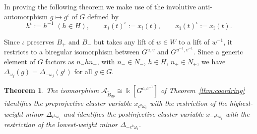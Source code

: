 \documentclass[12pt]{amsart}
\newcommand{\cA}{\mathcal{A}}
\newcommand{\kk}{\Bbbk}
\newcommand{\ol}[1]{\overline{#1}}
\newcommand{\Bdp}{\widetilde{B}_{dp}}
\newtheorem{theorem}{Theorem}[section]
\theoremstyle{remark}
\numberwithin{equation}{section}
\numberwithin{figure}{section}
\begin{document}
In proving the following theorem we make use of the involutive anti-automorphism $g \mapsto g^\iota$ of $G$ defined by
\begin{equation}
  h^\iota := h^{-1}\,\, (h\in H),
  \quad
  \quad
  x_i(t)^\iota := x_i(t),
  \quad
  \quad
  x_{\ol{\imath}}(t)^\iota := x_{\ol{\imath}}(t).
\end{equation}

Since $\iota$ preserves $B_+$ and $B_-$ but takes any lift of $w \in W$ to a lift of $w^{-1}$, it restricts to a biregular isomorphism between $G^{u,v}$ and $G^{u^{-1},v^{-1}}$.
Since a generic element of $G$ factors as $n_- h n_+$, with $n_- \in N_-$, $h \in H$, $n_+ \in N_+$, we have $\Delta_{\omega_j}(g) = \Delta_{-\omega_j}(g^\iota)$ for all $g \in G$.

\begin{theorem}\label{thm:mainirregular}
  The isomorphism $\cA_{\Bdp} \cong \kk[G^{c,c^{-1}}]$ of Theorem~\ref{thm:coordring} identifies the preprojective cluster variable $x_{c^k\omega_i}$ with the restriction of the highest-weight minor $\Delta_{c^k\omega_i}$ and identifies the postinjective cluster variable $x_{-c^k \omega_i}$ with the restriction of the lowest-weight minor $\Delta_{-c^k \omega_i}$.
\end{theorem}
\end{document}
